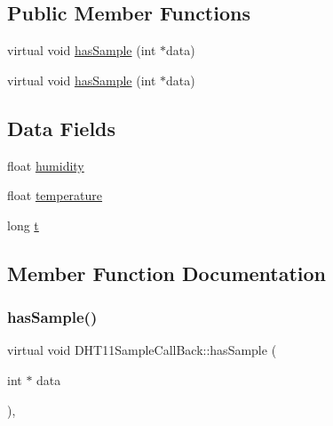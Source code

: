 \subsection*{Public Member Functions}
\begin{DoxyCompactItemize}
\item 
virtual void \hyperlink{classDHT11SampleCallBack_a4545eba34196517369e67058f0e14e93}{has\+Sample} (int $\ast$data)
\item 
virtual void \hyperlink{classDHT11SampleCallBack_a4545eba34196517369e67058f0e14e93}{has\+Sample} (int $\ast$data)
\end{DoxyCompactItemize}
\subsection*{Data Fields}
\begin{DoxyCompactItemize}
\item 
float \hyperlink{classDHT11SampleCallBack_aea1bc3b1d58de0365f32bf5098cd5734}{humidity}
\item 
float \hyperlink{classDHT11SampleCallBack_a897d17761377313be39c9e974a7df3f4}{temperature}
\item 
long \hyperlink{classDHT11SampleCallBack_a2a60b640929f5f6de7be95455f6cc365}{t}
\end{DoxyCompactItemize}


\subsection{Member Function Documentation}
\mbox{\label{classDHT11SampleCallBack_a4545eba34196517369e67058f0e14e93}} 
\subsubsection{\texorpdfstring{has\+Sample()}{hasSample()}\hspace{0.1cm}{\footnotesize\ttfamily [1/2]}}
{\footnotesize\ttfamily virtual void D\+H\+T11\+Sample\+Call\+Back\+::has\+Sample (\begin{DoxyParamCaption}\item[{int $\ast$}]{data }\end{DoxyParamCaption})\hspace{0.3cm}{\ttfamily [inline]}, {\ttfamily [virtual]}}


